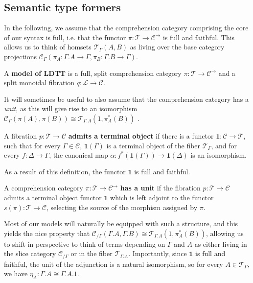 \subsection{Semantic type formers}\label{semtypform}
In the following, we assume that the comprehension category comprising the core of our syntax is full, i.e. that the functor $\pi : \mathcal{T} \to \mathcal{C}^{\to}$ is full and faithful. This allows us to think of homsets $\mathcal{T}_\Gamma(A, B)$ as living over the base category projections $\mathcal{C}_\Gamma(\pi_A : \Gamma.A \to \Gamma, \pi_B : \Gamma.B \to \Gamma)$.
\begin{defn}A \textbf{model of LDTT} is a full, split comprehension category $\pi : \mathcal{T} \to \mathcal{C}^{\to}$ and a split monoidal fibration $q : \mathcal{L} \to \mathcal{C}$.\\
\end{defn}
  It will sometimes be useful to also assume that the comprehension category has a \textit{unit}, as this will give rise to an isomorphism $\mathcal{C}_\Gamma(\pi(A), \pi(B)) \cong \mathcal{T}_{\Gamma.A}(1, \pi^*_A(B))$ \cite{jacobs}.
\begin{defn}
    A fibration $p : \mathcal{T} \to \mathcal{C}$ \textbf{admits a terminal object} if there is a functor $\mathbf{1} : \mathcal{C} \to \mathcal{T}$, such that for every $\Gamma \in \mathcal{C}$, $\mathbf{1}(\Gamma)$ is a terminal object of the fiber $\mathcal{T}_{\Gamma}$, and for every $f : \Delta \to \Gamma$, the canonical map $\alpha : f^*(\mathbf{1}(\Gamma)) \to \mathbf{1}(\Delta)$ is an isomorphism.
  \end{defn}
  As a result of this definition, the functor $\mathbf{1}$ is full and faithful.
  \begin{defn}
    A comprehension category $\pi : \mathcal{T} \to \mathcal{C}^{\to}$ \textbf{has a unit} if the fibration $p : \mathcal{T} \to \mathcal{C}$ admits a terminal object functor $\mathbf{1}$ which is left adjoint to the functor $s(\pi) : \mathcal{T} \to \mathcal{C}$, selecting the source of the morphism assigned by $\pi$.
  \end{defn}
  Most of our models will naturally be equipped with such a structure, and this yields the nice property that $\mathcal{C}_{/\Gamma}(\Gamma.A, \Gamma.B) \cong \mathcal{T}_{\Gamma.A}(1, \pi_A^*(B))$, allowing us to shift in perspective to think of terms depending on $\Gamma$ and $A$ as either living in the slice category $\mathcal{C}_{/\Gamma}$ or in the fiber $\mathcal{T}_{\Gamma.A}$. Importantly, since $\mathbf{1}$ is full and faithful, the unit of the adjunction is a natural isomorphism, so for every $A \in \mathcal{T}_\Gamma$, we have $\eta_A : \Gamma.A \cong \Gamma.A.1$.
